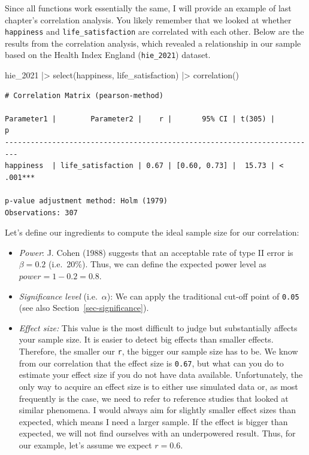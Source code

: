 \documentclass[
  letterpaper,
]{krantz}
\makeatletter
\newenvironment{Shaded}{\begin{snugshade}}{\end{snugshade}}
\newcommand{\FunctionTok}[1]{\textcolor[rgb]{0.28,0.35,0.67}{#1}}
\newcommand{\NormalTok}[1]{\textcolor[rgb]{0.00,0.23,0.31}{#1}}
\newcommand{\SpecialCharTok}[1]{\textcolor[rgb]{0.37,0.37,0.37}{#1}}
\newenvironment{kframe}{%
\medskip{}
\setlength{\fboxsep}{.8em}
 \def\at@end@of@kframe{}%
 \ifinner\ifhmode%
  \def\at@end@of@kframe{\end{minipage}}%
  \begin{minipage}{\columnwidth}%
 \fi\fi%
 \def\FrameCommand##1{\hskip\@totalleftmargin \hskip-\fboxsep
 \colorbox{shadecolor}{##1}\hskip-\fboxsep
     \hskip-\linewidth \hskip-\@totalleftmargin \hskip\columnwidth}%
 \MakeFramed {\advance\hsize-\width
   \@totalleftmargin\z@ \linewidth\hsize
   \@setminipage}}%
 {\par\unskip\endMakeFramed%
 \at@end@of@kframe}
\renewenvironment{Shaded}{\begin{kframe}}{\end{kframe}}
\makeatother
\begin{document}
Since all functions work essentially the same, I will provide an example
of last chapter's correlation analysis. You likely remember that we
looked at whether \texttt{happiness} and \texttt{life\_satisfaction} are
correlated with each other. Below are the results from the correlation
analysis, which revealed a relationship in our sample based on the
Health Index England (\texttt{hie\_2021}) dataset.

\begin{Shaded}
\begin{Highlighting}[]
\NormalTok{hie\_2021 }\SpecialCharTok{|\textgreater{}}
  \FunctionTok{select}\NormalTok{(happiness, life\_satisfaction) }\SpecialCharTok{|\textgreater{}}
  \FunctionTok{correlation}\NormalTok{()}
\end{Highlighting}
\end{Shaded}

\begin{verbatim}
# Correlation Matrix (pearson-method)

Parameter1 |        Parameter2 |    r |       95% CI | t(305) |         p
-------------------------------------------------------------------------
happiness  | life_satisfaction | 0.67 | [0.60, 0.73] |  15.73 | < .001***

p-value adjustment method: Holm (1979)
Observations: 307
\end{verbatim}

Let's define our ingredients to compute the ideal sample size for our
correlation:

\begin{itemize}
\item
  \emph{Power}: J. Cohen (1988) suggests that an acceptable rate of type
  II error is \(\beta = 0.2\) (i.e.~20\%). Thus, we can define the
  expected power level as \(power = 1 - 0.2 = 0.8\).
\item
  \emph{Significance level} (i.e.~\(\alpha\)): We can apply the
  traditional cut-off point of \texttt{0.05} (see also
  Section~\ref{sec-significance}).
\item
  \emph{Effect size:} This value is the most difficult to judge but
  substantially affects your sample size. It is easier to detect big
  effects than smaller effects. Therefore, the smaller our \texttt{r},
  the bigger our sample size has to be. We know from our correlation
  that the effect size is \texttt{0.67}, but what can you do to estimate
  your effect size if you do not have data available. Unfortunately, the
  only way to acquire an effect size is to either use simulated data or,
  as most frequently is the case, we need to refer to reference studies
  that looked at similar phenomena. I would always aim for slightly
  smaller effect sizes than expected, which means I need a larger
  sample. If the effect is bigger than expected, we will not find
  ourselves with an underpowered result. Thus, for our example, let's
  assume we expect \(r = 0.6\).
\end{itemize}
\end{document}
